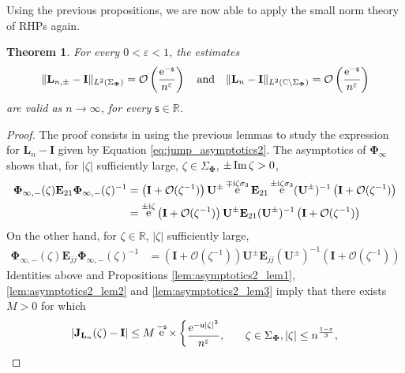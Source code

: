 \documentclass[reqno,a4paper,11pt]{amsart}
\DeclareMathOperator{\ee}{\rm e}
\renewcommand{\Im}{\mathop{\rm Im}}
\newcommand{\C}{\mathbb{C}}
\newcommand{\R}{\mathbb{R}}
\newcommand{\Boh}{\mathcal{O}}
\newcommand{\ii}{\mathrm{i}}
\renewcommand{\bm}{\mathbf}
\newcommand{\msf}{\mathsf}
\newcommand{\sad}{\msf s}
\newcommand{\uad}{\msf u}
\newtheorem{theorem}{Theorem}[section]
\theoremstyle{definition}
\theoremstyle{remark}
\numberwithin{equation}{section}
\begin{document}
Using the previous propositions, we are now able to apply the small norm theory of RHPs again.

\begin{theorem} \label{Thm:L_n to L_infty}
    For every $0 < \varepsilon < 1$, the estimates
    $$
    \|\bm L_{n,\pm}-\bm I\|_{L^2 (\Sigma_{\bm \Phi})}=\Boh\left(\frac{\ee^{-\sad}}{n^{\varepsilon}}\right) \quad
    \text{and}\quad 
    \|\bm L_{n}-\bm I\|_{L^2 (\C\setminus \Sigma_{\bm \Phi})}=\Boh\left(\frac{\ee^{-\sad}}{n^{\varepsilon}}\right)
    $$
    are valid as $n\to\infty$, for every $\sad \in \R$.
\end{theorem}

\begin{proof}
    The proof consists in using the previous lemmas to study the expression for $\bm L_n - \bm I$ given by Equation \eqref{eq:jump_asymptotics2}. The asymptotics of $\bm \Phi_\infty$ shows that, for $|\zeta|$ sufficiently large, $\zeta \in \Sigma_{\bm \Phi}$, $\pm \Im \zeta > 0$,
\[
    \begin{split}
    \bm \Phi_{\infty, -}(\zeta) \bm E_{21} \bm \Phi_{\infty, -}(\zeta)^{-1} 
    &=  \left( \bm I + \Boh(\zeta^{-1})\right) \bm U^{\pm} \ee^{\mp \ii \zeta \sigma_3} \bm E_{21} \ee^{\pm \ii \zeta \sigma_3} (\bm U^{\pm})^{-1} \left( \bm I + \Boh(\zeta^{-1})\right) \\
    &= \ee^{\pm \ii \zeta}\left( \bm I + \Boh(\zeta^{-1})\right) \bm U^{\pm}  \bm E_{2 1} (\bm U^{\pm})^{-1} \left( \bm I + \Boh(\zeta^{-1})\right)
    \end{split}
\]
    On the other hand, for $\zeta \in \R$, $|\zeta|$ sufficiently large,
    \[
        \begin{split}
            \bm \Phi_{\infty, -}(\zeta) \bm E_{jj} \bm \Phi_{\infty, -}(\zeta)^{-1} 
            &= \left( \bm I + \Boh(\zeta^{-1})\right) \bm U^{\pm}  \bm E_{jj} (\bm U^{\pm})^{-1} \left( \bm I + \Boh(\zeta^{-1})\right)
        \end{split}
    \]
    Identities above and Propositions \ref{lem:asymptotics2_lem1}, \ref{lem:asymptotics2_lem2} and \ref{lem:asymptotics2_lem3} imply that there exists $M > 0$ for which
    \[
        \left| \bm J_{\bm L_n}(\zeta) - \bm I\right| \leq 
        M \ee^{- \sad}\times
        \begin{dcases}
           \frac{\ee^{ - \uad |\zeta|^2}}{n^{\varepsilon}},
            \quad &\zeta \in \Sigma_{\bm \Phi}, |\zeta| \leq n^{\frac{1-\varepsilon}{3}}, \\

\end{dcases}\]
\end{proof}
\end{document}
